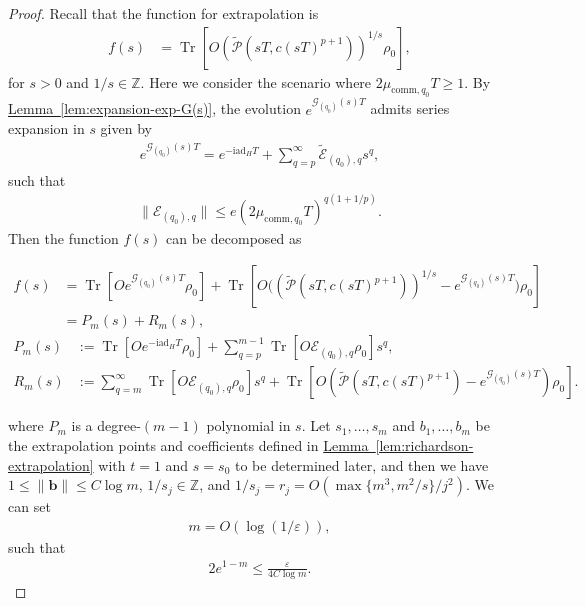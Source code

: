 \documentclass[aps,pra,reprint,groupedaddress,floatfix]{revtex4-2}
\newcommand{\lem}[1]{\hyperref[lem:#1]{Lemma~\ref*{lem:#1}}}
\renewcommand{\i}{\mathrm{i}}
\newcommand{\ad}{\mathrm{ad}}
\newcommand{\G}{\mathcal{G}}
\newcommand{\E}{\mathcal{E}}
\newcommand{\eps}{\varepsilon}
\newcommand{\mc}{\mathcal}
\newcommand{\mb}{\mathbb}
\begin{document}
\begin{proof}
    Recall that the function for extrapolation is \begin{align*}
        f(s)&=\operatorname{Tr}[O(\tilde{\mc P}(sT, c(sT)^{p+1}))^{1/s}\rho_0],
    \end{align*}
    for $s>0$ and $1/s\in \mb Z$.
    Here we consider the scenario where $2\mu_{\mathrm{comm},q_0} T \ge 1$. By \lem{expansion-exp-G(s)}, the evolution $e^{\G_{(q_0)}(s) T}$ admits series expansion in $s$ given by \begin{align*}
        e^{\G_{(q_0)}(s) T}=e^{-\i \ad_H T}+ \sum_{q=p}^{\infty}\tilde{\E}_{(q_0),q} s^q,
    \end{align*}
    such that \begin{align*}
        \|\E_{(q_0), q}\|\le e (2\mu_{\mathrm{comm},q_0}T)^{q(1+1/p)}.
    \end{align*}    
    Then the function $f(s)$ can be decomposed as
    \begin{widetext}
    \begin{align*}
        f(s)&= \operatorname{Tr}[Oe^{\G_{(q_0)}(s)T} \rho_0]+\operatorname{Tr}[O\bigl((\tilde{\mc P}(sT, c(sT)^{p+1}))^{1/s}-e^{\G_{(q_0)}(s)T}\bigr)\rho_0] \\
        &=P_m(s)+R_m(s),
    \end{align*}
    \begin{align*}
        P_m(s)&:=\operatorname{Tr}[Oe^{-\i \ad_H T}\rho_0]
        +\sum_{q=p}^{m-1}\operatorname{Tr}[O \E_{(q_0), q}\rho_0] s^q,\\
        R_m(s)&:=\sum_{q=m}^{\infty}\operatorname{Tr}[O\E_{(q_0), q}\rho_0]s^q
        +\operatorname{Tr}[O(\tilde{\mc P}(sT, c(sT)^{p+1})-e^{\G_{(q_0)}(s)T})\rho_0].
    \end{align*}
    \end{widetext}
    where $P_m$ is a degree-$(m-1)$ polynomial in $s$. Let $s_1, \ldots, s_m$ and $b_1, \ldots, b_m$ be the extrapolation points and coefficients defined in \lem{richardson-extrapolation} with $t=1$ and $s = s_0$ to be determined later, and then we have $1\le\|\mathbf{b}\|\le C\log m$, $1/s_j\in \mathbb{Z}$, and $1/s_j = r_j = O(\max\{m^3, m^2/s\}/j^2)$. We can set \begin{align*}
        m = O(\log(1/\eps)),
    \end{align*}
    such that \begin{align}
    \label{eq:cond-m}
        2e^{1-m} \le \frac{\eps}{4C\log m}.
    \end{align}
    

\end{proof}
\end{document}
